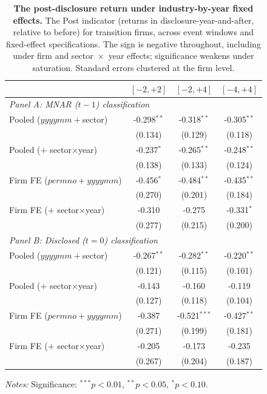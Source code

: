 \documentclass[a4paper,12pt]{article}
\begin{document}
\begin{table}[htbp]
\footnotesize\centering
\caption{\textbf{The post-disclosure return under industry-by-year fixed effects.}
The Post indicator (returns in disclosure-year-and-after, relative to before) for
transition firms, across event windows and fixed-effect specifications. The sign
is negative throughout, including under firm and sector~$\times$~year effects;
significance weakens under saturation. Standard errors clustered at the firm level.}
\label{tab:returns_did_post_iy}
\begin{tabular}{lccc}
\toprule
 & $[-2,+2]$ & $[-2,+4]$ & $[-4,+4]$ \\
\midrule
\multicolumn{4}{l}{\emph{Panel A: MNAR ($t-1$) classification}} \\[2pt]
Pooled ($yyyymm+$sector) & -0.298$^{**}$ & -0.318$^{**}$ & -0.305$^{**}$ \\
 & (0.134) & (0.129) & (0.118) \\
Pooled ($+$ sector$\times$year) & -0.237$^{*}$ & -0.265$^{**}$ & -0.248$^{**}$ \\
 & (0.138) & (0.133) & (0.124) \\
Firm FE ($permno+yyyymm$) & -0.456$^{*}$ & -0.484$^{**}$ & -0.435$^{**}$ \\
 & (0.270) & (0.201) & (0.184) \\
Firm FE ($+$ sector$\times$year) & -0.310 & -0.275 & -0.331$^{*}$ \\
 & (0.277) & (0.215) & (0.200) \\
\midrule
\multicolumn{4}{l}{\emph{Panel B: Disclosed ($t=0$) classification}} \\[2pt]
Pooled ($yyyymm+$sector) & -0.267$^{**}$ & -0.282$^{**}$ & -0.220$^{**}$ \\
 & (0.121) & (0.115) & (0.101) \\
Pooled ($+$ sector$\times$year) & -0.143 & -0.160 & -0.119 \\
 & (0.127) & (0.118) & (0.104) \\
Firm FE ($permno+yyyymm$) & -0.387 & -0.521$^{***}$ & -0.427$^{**}$ \\
 & (0.271) & (0.199) & (0.181) \\
Firm FE ($+$ sector$\times$year) & -0.205 & -0.173 & -0.235 \\
 & (0.267) & (0.204) & (0.187) \\
\bottomrule
\end{tabular}
\begin{flushleft}\footnotesize
\textit{Notes:} Significance: $^{***}p<0.01$, $^{**}p<0.05$, $^{*}p<0.10$.
\end{flushleft}
\end{table}
\end{document}
